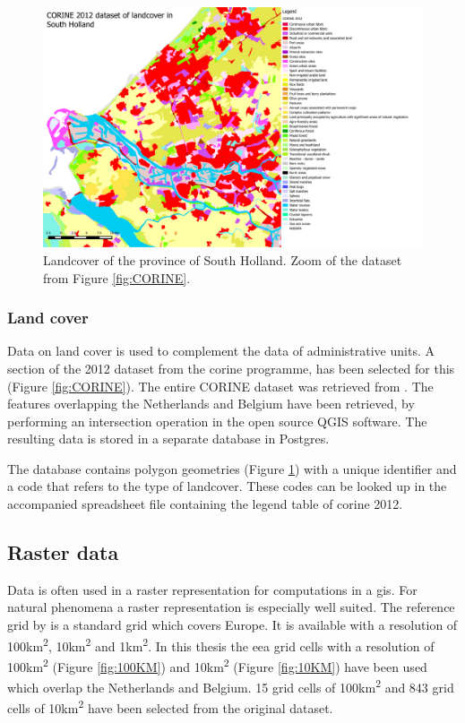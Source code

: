 \begin{figure}
	\centering
	\includegraphics[width=1\linewidth]{figs/CORINE_NL_BE_color_zoom.PDF}
	\caption{Landcover of the province of South Holland. Zoom of the dataset from Figure \ref{fig:CORINE}.}
	\label{fig:CORINEZOOM}
\end{figure}

\subsubsection{Land cover}
\begin{sloppypar}
	Data on land cover is used to complement the data of administrative units. A section of the 2012 dataset from the \ac{corine} programme, has been selected for this (Figure \ref{fig:CORINE}). The entire CORINE dataset was retrieved from \cite{DATA:CLC}. The features overlapping the Netherlands and Belgium have been retrieved, by performing an intersection operation in the open source QGIS software. The resulting data is stored in a separate database in Postgres. 
	
	The database contains polygon geometries (Figure \ref{fig:CORINEZOOM}) with a unique identifier and a code that refers to the type of landcover. These codes can be looked up in the accompanied spreadsheet file containing the legend table of \ac{corine} 2012.  	
\end{sloppypar}

\subsection{Raster data}
Data is often used in a raster representation for computations in a \ac{gis}. For natural phenomena a raster representation is especially well suited. The reference grid by \cite{DATA:EEA} is a standard grid which covers Europe. It is available with a resolution of 100km\textsuperscript{2}, 10km\textsuperscript{2} and 1km\textsuperscript{2}. In this thesis the \ac{eea} grid cells with a resolution of 100km\textsuperscript{2} (Figure \ref{fig:100KM}) and 10km\textsuperscript{2} (Figure \ref{fig:10KM}) have been used which overlap the Netherlands and Belgium. 15 grid cells of 100km\textsuperscript{2} and 843 grid cells of 10km\textsuperscript{2} have been selected from the original dataset.  

